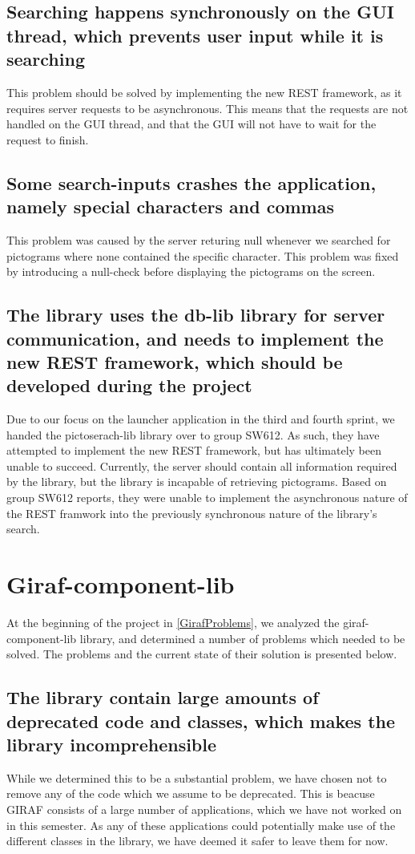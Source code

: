 \subsection*{Searching happens synchronously on the GUI thread, which prevents
user input while it is searching}
This problem should be solved by implementing the new REST framework, as it
requires server requests to be  asynchronous. This means that the requests are
not handled on the GUI thread, and that the GUI will not have to wait for the
request to finish.
  
\subsection*{Some search-inputs crashes the application, namely special
characters and commas}
This problem was caused by the server returing null whenever we searched for
pictograms where none contained the specific character. This problem was fixed
by introducing a null-check before displaying the pictograms on the screen.
  
  
\subsection*{The library uses the db-lib library for server communication, and
needs to implement the new REST framework, which should be developed during the
project}
Due to our focus on the launcher application in the third and fourth sprint, we
handed the pictoserach-lib library over to group SW612. As such, they have
attempted to implement the new REST framework, but has ultimately been unable to
succeed. Currently, the server should contain all information required by the
library, but the library is incapable of retrieving pictograms. Based on group
SW612 reports, they were unable to implement the asynchronous nature of the REST
framwork into the previously synchronous nature of the library's search.

\section{Giraf-component-lib}
At the beginning of the project in \autoref{GirafProblems}, we analyzed the
giraf-component-lib library, and determined a number of problems which needed to
be solved. The problems and the current state of their solution is presented
below.

\subsection*{The library contain large amounts of deprecated code and classes,
which makes the library incomprehensible}
While we determined this to be a substantial problem, we have chosen not to
remove any of the code which we assume to be deprecated. This is beacuse GIRAF
consists of a large number of applications, which we have not worked on in this
semester. As any of these applications could potentially make use of the
different classes in the library, we have deemed it safer to leave them for now.

